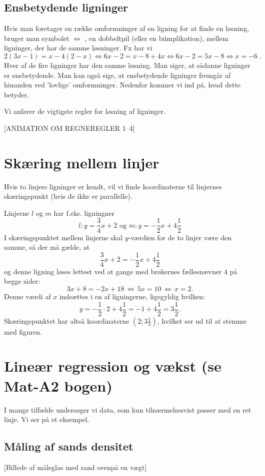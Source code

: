 \documentclass[12pt,oneside,a4paper]{article}
\begin{document}
\subsection{Ensbetydende ligninger}
Hvis man foretager en række omformninger af en ligning for at finde en løsning,
bruger man symbolet $\iff$ , en dobbeltpil (eller en biimplikation), mellem
ligninger, der har de samme løsninger. Fx har vi
$$
2(3x - 1) = x - 4(2 - x)\iff 6x - 2 = x - 8 + 4x\iff
6x - 2 = 5x - 8 \iff x = -6 \; .
$$
Hver af de fire ligninger har den samme løsning. Man siger, at sådanne
ligninger er ensbetydende. Man kan også sige, at ensbetydende ligninger fremgår
af hinanden ved ’lovlige’ omformninger. Nedenfor kommer vi ind på, hvad dette
betyder.

Vi anfører de vigtigste regler for løsning af ligninger.

[ANIMATION OM REGNEREGLER 1--4]


\section{Skæring mellem linjer}
Hvis to linjers ligninger er kendt, vil vi finde koordinaterne til linjernes
skæringspunkt (hvis de ikke er parallelle).

Linjerne $l$ og $m$ har f.eks. ligningner
$$
l: y=\frac{3}{4}x+2\,\,{\mbox{og}}\,\,m: y=-\frac{1}{2}x+4\frac{1}{2}
$$
I skæringspunktet mellem linjerne skal $y$-værdien for de to linjer være den
samme, så der må gælde, at
$$
\frac{3}{4}x+2=-\frac{1}{2}x+4\frac{1}{2}
$$
og denne ligning løses lettest ved at gange med brøkernes fællesnævner $4$ på
begge sider:
$$
3x+8 = -2x+18\,\Leftrightarrow\,5x=10\,\Leftrightarrow\,x=2.
$$
Denne værdi af $x$ indsættes i en af ligningerne, ligegyldig hvilken:
$$
y=-\frac{1}{2}\cdot 2+4\frac{1}{2} = -1+4\frac12 = 3\frac12.
$$
Skæringspunktet har altså koordinaterne $(2; 3\frac12)$, hvilket ser ud til at
stemme med figuren.

\section{Lineær regression og vækst (se Mat-A2 bogen)}
I mange tilfælde undersøger vi data, som kun tilnærmelsesvist passer med en ret
linje. Vi ser på et eksempel.

\subsection{Måling af sands densitet}
[Billede af måleglas med sand ovenpå en vægt]
\end{document}
